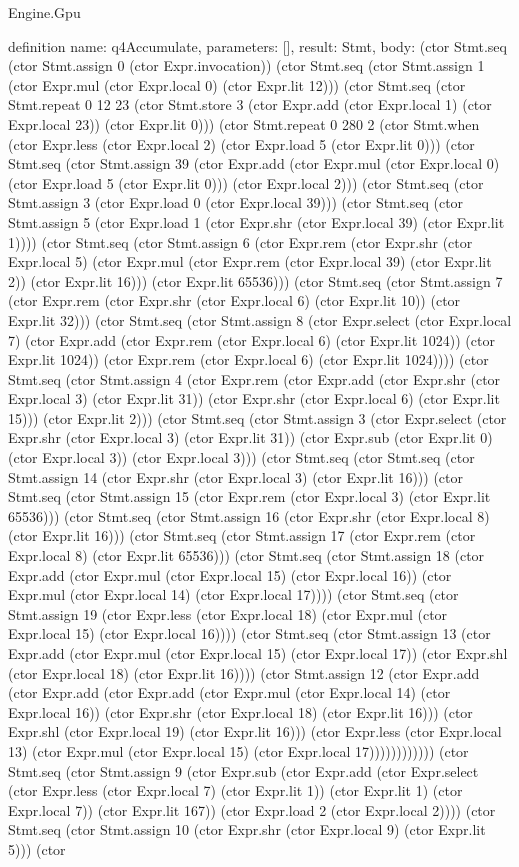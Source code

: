 \begin{lexlean}{Engine.Gpu}
\begin{semanticmodule}
definition{
  name: q4Accumulate,
  parameters: [],
  result: Stmt,
  body: (ctor Stmt.seq (ctor Stmt.assign 0 (ctor Expr.invocation)) (ctor Stmt.seq (ctor Stmt.assign 1 (ctor Expr.mul (ctor Expr.local 0) (ctor Expr.lit 12))) (ctor Stmt.seq (ctor Stmt.repeat 0 12 23 (ctor Stmt.store 3 (ctor Expr.add (ctor Expr.local 1) (ctor Expr.local 23)) (ctor Expr.lit 0))) (ctor Stmt.repeat 0 280 2 (ctor Stmt.when (ctor Expr.less (ctor Expr.local 2) (ctor Expr.load 5 (ctor Expr.lit 0))) (ctor Stmt.seq (ctor Stmt.assign 39 (ctor Expr.add (ctor Expr.mul (ctor Expr.local 0) (ctor Expr.load 5 (ctor Expr.lit 0))) (ctor Expr.local 2))) (ctor Stmt.seq (ctor Stmt.assign 3 (ctor Expr.load 0 (ctor Expr.local 39))) (ctor Stmt.seq (ctor Stmt.assign 5 (ctor Expr.load 1 (ctor Expr.shr (ctor Expr.local 39) (ctor Expr.lit 1)))) (ctor Stmt.seq (ctor Stmt.assign 6 (ctor Expr.rem (ctor Expr.shr (ctor Expr.local 5) (ctor Expr.mul (ctor Expr.rem (ctor Expr.local 39) (ctor Expr.lit 2)) (ctor Expr.lit 16))) (ctor Expr.lit 65536))) (ctor Stmt.seq (ctor Stmt.assign 7 (ctor Expr.rem (ctor Expr.shr (ctor Expr.local 6) (ctor Expr.lit 10)) (ctor Expr.lit 32))) (ctor Stmt.seq (ctor Stmt.assign 8 (ctor Expr.select (ctor Expr.local 7) (ctor Expr.add (ctor Expr.rem (ctor Expr.local 6) (ctor Expr.lit 1024)) (ctor Expr.lit 1024)) (ctor Expr.rem (ctor Expr.local 6) (ctor Expr.lit 1024)))) (ctor Stmt.seq (ctor Stmt.assign 4 (ctor Expr.rem (ctor Expr.add (ctor Expr.shr (ctor Expr.local 3) (ctor Expr.lit 31)) (ctor Expr.shr (ctor Expr.local 6) (ctor Expr.lit 15))) (ctor Expr.lit 2))) (ctor Stmt.seq (ctor Stmt.assign 3 (ctor Expr.select (ctor Expr.shr (ctor Expr.local 3) (ctor Expr.lit 31)) (ctor Expr.sub (ctor Expr.lit 0) (ctor Expr.local 3)) (ctor Expr.local 3))) (ctor Stmt.seq (ctor Stmt.seq (ctor Stmt.assign 14 (ctor Expr.shr (ctor Expr.local 3) (ctor Expr.lit 16))) (ctor Stmt.seq (ctor Stmt.assign 15 (ctor Expr.rem (ctor Expr.local 3) (ctor Expr.lit 65536))) (ctor Stmt.seq (ctor Stmt.assign 16 (ctor Expr.shr (ctor Expr.local 8) (ctor Expr.lit 16))) (ctor Stmt.seq (ctor Stmt.assign 17 (ctor Expr.rem (ctor Expr.local 8) (ctor Expr.lit 65536))) (ctor Stmt.seq (ctor Stmt.assign 18 (ctor Expr.add (ctor Expr.mul (ctor Expr.local 15) (ctor Expr.local 16)) (ctor Expr.mul (ctor Expr.local 14) (ctor Expr.local 17)))) (ctor Stmt.seq (ctor Stmt.assign 19 (ctor Expr.less (ctor Expr.local 18) (ctor Expr.mul (ctor Expr.local 15) (ctor Expr.local 16)))) (ctor Stmt.seq (ctor Stmt.assign 13 (ctor Expr.add (ctor Expr.mul (ctor Expr.local 15) (ctor Expr.local 17)) (ctor Expr.shl (ctor Expr.local 18) (ctor Expr.lit 16)))) (ctor Stmt.assign 12 (ctor Expr.add (ctor Expr.add (ctor Expr.add (ctor Expr.mul (ctor Expr.local 14) (ctor Expr.local 16)) (ctor Expr.shr (ctor Expr.local 18) (ctor Expr.lit 16))) (ctor Expr.shl (ctor Expr.local 19) (ctor Expr.lit 16))) (ctor Expr.less (ctor Expr.local 13) (ctor Expr.mul (ctor Expr.local 15) (ctor Expr.local 17)))))))))))) (ctor Stmt.seq (ctor Stmt.assign 9 (ctor Expr.sub (ctor Expr.add (ctor Expr.select (ctor Expr.less (ctor Expr.local 7) (ctor Expr.lit 1)) (ctor Expr.lit 1) (ctor Expr.local 7)) (ctor Expr.lit 167)) (ctor Expr.load 2 (ctor Expr.local 2)))) (ctor Stmt.seq (ctor Stmt.assign 10 (ctor Expr.shr (ctor Expr.local 9) (ctor Expr.lit 5))) (ctor }
\end{semanticmodule}
\end{lexlean}
